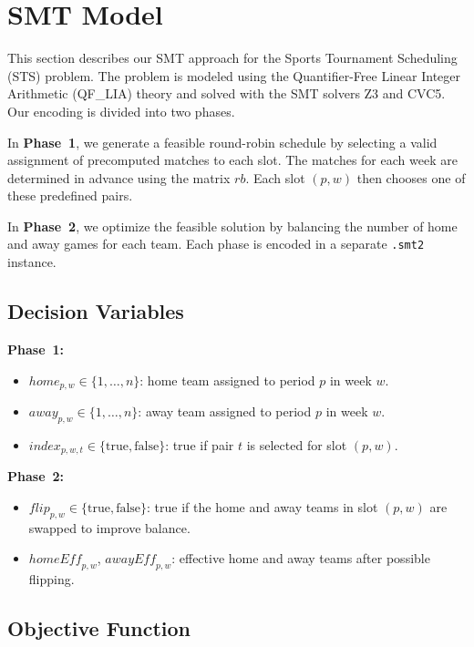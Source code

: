 \section{SMT Model}
This section describes our SMT approach for the Sports Tournament Scheduling (STS) problem.  
The problem is modeled using the Quantifier-Free Linear Integer Arithmetic (QF\_LIA) theory and solved with the SMT solvers Z3 and CVC5.  
Our encoding is divided into two phases.

In \textbf{Phase~1}, we generate a feasible round-robin schedule by selecting a valid assignment of precomputed matches to each slot. The matches for each week are determined in advance using the matrix $rb$. Each slot $(p,w)$ then chooses one of these predefined pairs.

In \textbf{Phase~2}, we optimize the feasible solution by balancing the number of home and away games for each team.  
Each phase is encoded in a separate \texttt{.smt2} instance.

\subsection{Decision Variables}

\textbf{Phase~1:}
\begin{itemize}
    \item $\mathit{home}_{p,w} \in \{1,\dots,n\}$: home team assigned to period $p$ in week $w$.
    \item $\mathit{away}_{p,w} \in \{1,\dots,n\}$: away team assigned to period $p$ in week $w$.
    \item $\mathit{index}_{p,w,t} \in \{\text{true}, \text{false}\}$: true if pair $t$ is selected for slot $(p,w)$.
\end{itemize}

\textbf{Phase~2:}
\begin{itemize}
    \item $\mathit{flip}_{p,w} \in \{\text{true}, \text{false}\}$: true if the home and away teams in slot $(p,w)$ are swapped to improve balance.
    \item $\mathit{homeEff}_{p,w}$, $\mathit{awayEff}_{p,w}$: effective home and away teams after possible flipping.
\end{itemize}

\subsection{Objective Function}

